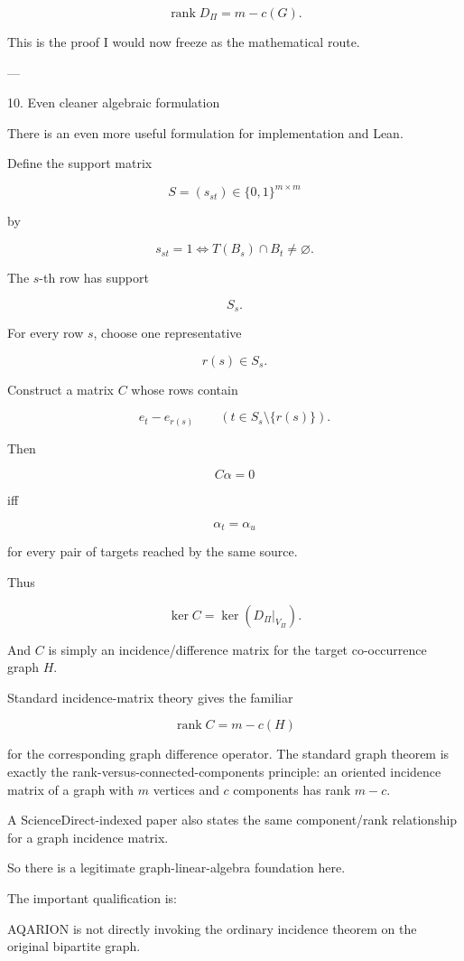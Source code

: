 \[
\boxed{
\operatorname{rank}D_\Pi
=
m-c(G).
}
\]

This is the proof I would now freeze as the mathematical route.


---

10. Even cleaner algebraic formulation

There is an even more useful formulation for implementation and Lean.

Define the support matrix

\[
S=(s_{st})\in\{0,1\}^{m\times m}
\]

by

\[
s_{st}=1
\iff
T(B_s)\cap B_t\neq\varnothing.
\]

The \(s\)-th row has support

\[
S_s.
\]

For every row \(s\), choose one representative

\[
r(s)\in S_s.
\]

Construct a matrix \(C\) whose rows contain

\[
e_t-e_{r(s)}
\qquad
(t\in S_s\setminus\{r(s)\}).
\]

Then

\[
C\alpha=0
\]

iff

\[
\alpha_t=\alpha_u
\]

for every pair of targets reached by the same source.

Thus

\[
\boxed{
\ker C
=
\ker(D_\Pi|_{V_\Pi}).
}
\]

And \(C\) is simply an incidence/difference matrix for the target co-occurrence graph \(H\).

Standard incidence-matrix theory gives the familiar

\[
\operatorname{rank}C=m-c(H)
\]

for the corresponding graph difference operator. The standard graph theorem is exactly the rank-versus-connected-components principle: an oriented incidence matrix of a graph with \(m\) vertices and \(c\) components has rank \(m-c\). 

A ScienceDirect-indexed paper also states the same component/rank relationship for a graph incidence matrix. 

So there is a legitimate graph-linear-algebra foundation here.

The important qualification is:

AQARION is not directly invoking the ordinary incidence theorem on the original bipartite graph.

